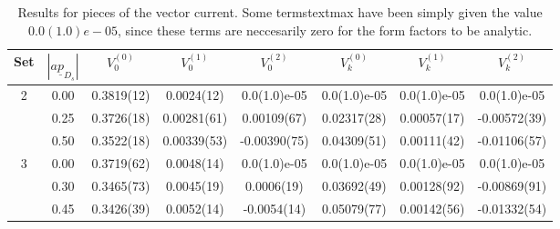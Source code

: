 \begin{table}
\begin{center}
\begin{tabular}{|| c c c c c c c c ||}
\hline
Set & $|a\underline{p}_{D_s}|$ & $V_0^{(0)}$ & $V_0^{(1)}$ & $V_0^{(2)}$ & $V_k^{(0)}$ & $V_k^{(1)}$ & $V_k^{(2)}$ \\ [0.5ex]
\hline \hline
2 & 0.00 & 0.3819(12) & 0.0024(12) & 0.0(1.0)e-05 & 0.0(1.0)e-05 & 0.0(1.0)e-05 & 0.0(1.0)e-05\\ [0.5ex] 
 & 0.25 & 0.3726(18) & 0.00281(61) & 0.00109(67) & 0.02317(28) & 0.00057(17) & -0.00572(39)\\ [0.5ex] 
 & 0.50 & 0.3522(18) & 0.00339(53) & -0.00390(75) & 0.04309(51) & 0.00111(42) & -0.01106(57)\\ [0.5ex] 
3 & 0.00 & 0.3719(62) & 0.0048(14) & 0.0(1.0)e-05 & 0.0(1.0)e-05 & 0.0(1.0)e-05 & 0.0(1.0)e-05\\ [0.5ex] 
 & 0.30 & 0.3465(73) & 0.0045(19) & 0.0006(19) & 0.03692(49) & 0.00128(92) & -0.00869(91)\\ [0.5ex] 
 & 0.45 & 0.3426(39) & 0.0052(14) & -0.0054(14) & 0.05079(77) & 0.00142(56) & -0.01332(54)\\ [0.5ex] 
\hline
\end{tabular}
\caption{Results for pieces of the vector current. Some termstext{max} have been simply given the value $0.0(1.0)e-05$, since these terms are neccesarily zero for the form factors to be analytic. \label{table:fitresults} }
\end{center}
\end{table}


